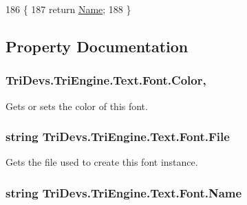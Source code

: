 \begin{DoxyCode}
186         \{
187             \textcolor{keywordflow}{return} \hyperlink{class_tri_devs_1_1_tri_engine_1_1_text_1_1_font_a20de06ff34d29e2bf82a646927af1111}{Name};
188         \}
\end{DoxyCode}


\subsection{Property Documentation}
\hypertarget{class_tri_devs_1_1_tri_engine_1_1_text_1_1_font_a105a762f5fe79ea55c3134fca61ac709}{
\subsubsection[{Color}]{ Tri\-Devs.\-Tri\-Engine.\-Text.\-Font.\-Color\hspace{0.3cm}{\ttfamily [get]}, {\ttfamily [set]}}}\label{class_tri_devs_1_1_tri_engine_1_1_text_1_1_font_a105a762f5fe79ea55c3134fca61ac709}


Gets or sets the color of this font. 

\hypertarget{class_tri_devs_1_1_tri_engine_1_1_text_1_1_font_a182e4fefabd538c9bc2e265f5e8e9368}{
\subsubsection[{File}]{\setlength{\rightskip}{0pt plus 5cm}string Tri\-Devs.\-Tri\-Engine.\-Text.\-Font.\-File\hspace{0.3cm}{\ttfamily [get]}}}\label{class_tri_devs_1_1_tri_engine_1_1_text_1_1_font_a182e4fefabd538c9bc2e265f5e8e9368}


Gets the file used to create this font instance. 

\hypertarget{class_tri_devs_1_1_tri_engine_1_1_text_1_1_font_a20de06ff34d29e2bf82a646927af1111}{
\subsubsection[{Name}]{\setlength{\rightskip}{0pt plus 5cm}string Tri\-Devs.\-Tri\-Engine.\-Text.\-Font.\-Name\hspace{0.3cm}{\ttfamily [get]}}}\label{class_tri_devs_1_1_tri_engine_1_1_text_1_1_font_a20de06ff34d29e2bf82a646927af1111}


